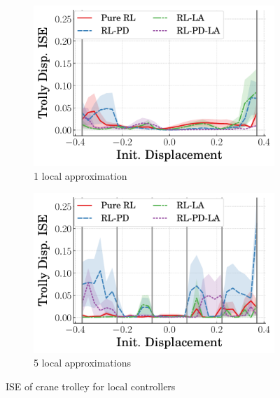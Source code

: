 \begin{figure}[t]
    \centering
    \begin{subfigure}[b]{0.49\textwidth}
        \centering
        \includegraphics[width=\textwidth]{figures/figures_Interpretability/Mean_ISE_dpcrane_cubic_1_bins/Mean_ISE_dpcrane_cubic_Trolly_Disp_1_bins.pdf}
        \caption{1 local approximation}
        \label{subfig_chap5:dpcrane_trolley_unclipped_approx_error_1_bins}
    \end{subfigure}
    \hfill
    \begin{subfigure}[b]{0.49\textwidth}
        \centering
        \includegraphics[width=\textwidth]{figures/figures_Interpretability/Mean_ISE_dpcrane_cubic_5_bins/Mean_ISE_dpcrane_cubic_Trolly_Disp_5_bins.pdf}
        \caption{5 local approximations}
        \label{subfig_chap5:dpcrane_trolley_unclipped_approx_error_5_bins}
    \end{subfigure}
       \caption{ISE of crane trolley for local controllers}
       \label{fig_chap5:dpcrane_trolley_unclipped_approx_error}
\end{figure}

